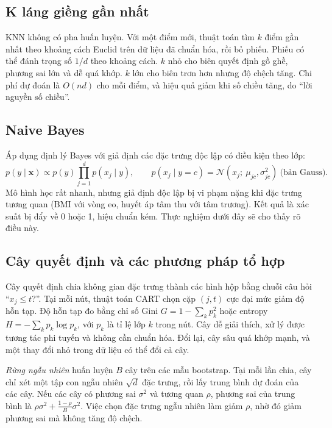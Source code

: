 \subsection{K láng giềng gần nhất}

KNN \cite{cover1967} không có pha huấn luyện. Với một điểm mới, thuật toán tìm $k$ điểm gần nhất theo khoảng cách Euclid trên dữ liệu đã chuẩn hóa, rồi bỏ phiếu. Phiếu có thể đánh trọng số $1/d$ theo khoảng cách. $k$ nhỏ cho biên quyết định gồ ghề, phương sai lớn và dễ quá khớp. $k$ lớn cho biên trơn hơn nhưng độ chệch tăng. Chi phí dự đoán là $O(nd)$ cho mỗi điểm, và hiệu quả giảm khi số chiều tăng, do ``lời nguyền số chiều''.

\subsection{Naive Bayes}

Áp dụng định lý Bayes với giả định các đặc trưng độc lập có điều kiện theo lớp:
\begin{equation}
p(y\mid\mathbf x) \propto p(y)\prod_{j=1}^d p(x_j\mid y), \qquad p(x_j\mid y=c) = \mathcal N(x_j;\ \mu_{jc}, \sigma^2_{jc}) \ \text{(bản Gauss)}.
\label{eq:nb}
\end{equation}
Mô hình học rất nhanh, nhưng giả định độc lập bị vi phạm nặng khi đặc trưng tương quan (BMI với vòng eo, huyết áp tâm thu với tâm trương). Kết quả là xác suất bị đẩy về 0 hoặc 1, hiệu chuẩn kém. Thực nghiệm dưới đây sẽ cho thấy rõ điều này.

\subsection{Cây quyết định và các phương pháp tổ hợp}

Cây quyết định chia không gian đặc trưng thành các hình hộp bằng chuỗi câu hỏi ``$x_j \le t$?''. Tại mỗi nút, thuật toán CART chọn cặp $(j,t)$ cực đại mức giảm độ hỗn tạp. Độ hỗn tạp đo bằng chỉ số Gini $G = 1-\sum_k p_k^2$ hoặc entropy $H=-\sum_k p_k\log p_k$, với $p_k$ là tỉ lệ lớp $k$ trong nút. Cây dễ giải thích, xử lý được tương tác phi tuyến và không cần chuẩn hóa. Đổi lại, cây sâu quá khớp mạnh, và một thay đổi nhỏ trong dữ liệu có thể đổi cả cây.

\emph{Rừng ngẫu nhiên} \cite{breiman2001} huấn luyện $B$ cây trên các mẫu bootstrap. Tại mỗi lần chia, cây chỉ xét một tập con ngẫu nhiên $\sqrt d$ đặc trưng, rồi lấy trung bình dự đoán của các cây. Nếu các cây có phương sai $\sigma^2$ và tương quan $\rho$, phương sai của trung bình là $\rho\sigma^2 + \frac{1-\rho}{B}\sigma^2$. Việc chọn đặc trưng ngẫu nhiên làm giảm $\rho$, nhờ đó giảm phương sai mà không tăng độ chệch.

